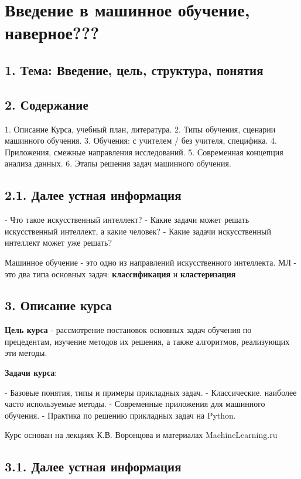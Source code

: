 \section{Введение в машинное обучение, наверное???}

\subsection{1. Тема: Введение, цель, структура, понятия}

\subsection{2. Содержание}

1. Описание Курса, учебный план, литература.
2. Типы обучения, сценарии машинного обучения.
3. Обучения: с учителем / без учителя, специфика.
4. Приложения, смежные направления исследований.
5. Современная концепция анализа данных.
6. Этапы решения задач машинного обучения.

\subsection{2.1. Далее устная информация}

- Что такое искусственный интеллект?
- Какие задачи может решать искусственный интеллект, а какие человек?
- Какие задачи искусственный интеллект может уже решать?

Машинное обучение - это одно из направлений искусственного интеллекта.
МЛ - это два типа основных задач: \textbf{классификация} и \textbf{кластеризация}
\subsection{3. Описание курса}

\textbf{Цель курса} - рассмотрение постановок основных задач обучения по
прецедентам, изучение методов их решения, а также алгоритмов,
реализующих эти методы.

\textbf{Задачи курса}:

- Базовые понятия, типы и примеры прикладных задач.
- Классические. наиболее часто используемые методы.
- Современные приложения для машинного обучения.
- Практика по решению прикладных задач на Python.

Курс основан на лекциях К.В. Воронцова и материалах MachineLearning.ru

\subsection{3.1. Далее устная информация}

